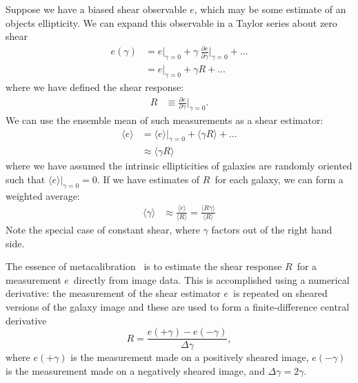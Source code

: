 \documentclass[a4paper,fleqn,usenatbib]{mnras}
\newcommand{\est}{$e$}
\newcommand{\mest}{e}
\newcommand{\mcal}{metacalibration}
\newcommand{\mcalR}{$R$}
\begin{document}
Suppose we have a biased shear observable \est, which may be some estimate of
an objects ellipticity. We can expand this observable in a Taylor
series about zero shear
\begin{align} \label{eq:Eexpand}
    \mest(\gamma) &= \mest|_{\gamma=0} + \gamma ~ \frac{ \partial \mest }{ \partial \gamma }\bigg|_{\gamma=0}  + ... \nonumber \\
                  &= \mest|_{\gamma=0} + \gamma \mbox{\mcalR} + ...
\end{align}
where we have defined the shear response:
\begin{align}
    \mbox{\mcalR} &\equiv \frac{\partial \mest}{\partial \gamma} \bigg|_{\gamma=0}.
\end{align}
We can use the ensemble mean of such measurements as a shear estimator:
\begin{align}
    \langle \mest \rangle &= \langle \mest \rangle |_{\gamma=0} + \langle \gamma \mbox{\mcalR} \rangle + ... \nonumber \\
                          &\approx \langle \gamma \mbox{\mcalR} \rangle
\end{align}
where we have assumed the intrinsic ellipticities of galaxies are
randomly oriented such that $\langle \mest \rangle |_{\gamma=0} = 0$.
If we have estimates of \mcalR\ for each galaxy, we
can form a weighted average:
\begin{align}
    \langle \gamma \rangle &\approx \frac{\langle \mest \rangle}{\langle \mbox{\mcalR} \rangle} = \frac{\langle R \gamma \rangle}{\langle \mbox{\mcalR} \rangle}
\end{align}
Note the special case of constant shear, where $\gamma$ factors out
of the right hand side.

The essence of \mcal\ \citep{HuffMcal} is to estimate the shear response
\mcalR\ for a measurement \est\ directly from image data.  This is
accomplished using a numerical derivative: the measurement of
the shear estimator \est\ is repeated on sheared versions of the galaxy
image and these are used to form a finite-difference central derivative
\begin{equation} \label{eq:Rnum}
    R = \frac{\mest(+\gamma) - \mest(-\gamma)}{\Delta \gamma},
\end{equation}
where $\mest(+\gamma)$ is the measurement made on a positively sheared
image, $\mest(-\gamma)$ is the measurement made on a negatively
sheared image, and $\Delta \gamma = 2\gamma$.
\end{document}
